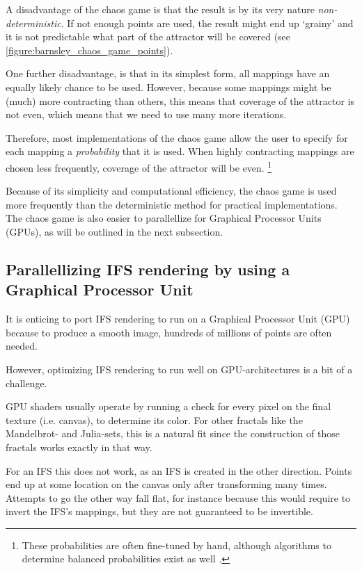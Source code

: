 \documentclass[11pt]{article}
\newcommand*{\altasterism}{\vspace*{1em plus .5em minus .5em}\noindent\hspace*{\fill}\ding{104}\hspace*{\fill}}
\begin{document}
A disadvantage of the chaos game is that the result is by its very nature \emph{non-deterministic}.
If not enough points are used, the result might end up `grainy' and it is not predictable what part of the attractor will be covered (see \autoref{figure:barnsley_chaos_game_points}).

One further disadvantage, is that in its simplest form, all mappings have an equally likely chance to be used.
However, because some mappings might be (much) more contracting than others, this means that coverage of the attractor is not even,
which means that we need to use many more iterations.

Therefore, most implementations of the chaos game allow the user to specify for each mapping a \emph{probability} that it is used. 
When highly contracting mappings are chosen less frequently, coverage of the attractor will be even. \footnote{These probabilities are often fine-tuned by hand, although algorithms to determine balanced probabilities exist as well \cite{hepting1991rendering}.}

\altasterism

Because of its simplicity and computational efficiency, the chaos game is used more frequently than the deterministic method for practical implementations.
The chaos game is also easier to parallellize for Graphical Processor Units (GPUs), as will be outlined in the next subsection.

\subsection{Parallellizing IFS rendering by using a Graphical Processor Unit}
\label{sec:org046b784}

It is enticing to port IFS rendering to run on a Graphical Processor Unit (GPU) because to produce a smooth image, hundreds of millions of points are often needed.

However, optimizing IFS rendering to run well on GPU-architectures is a bit of a challenge.

GPU shaders usually operate by running a check for every pixel on the final texture (i.e. canvas), to determine its color.
For other fractals like the Mandelbrot- and Julia-sets, this is a natural fit since the construction of those fractals works exactly in that way.

For an IFS this does not work, as an IFS is created in the other direction. Points end up at some location on the canvas only after transforming many times.
Attempts to go the other way fall flat, for instance because this would require to invert the IFS's mappings, but they are not guaranteed to be invertible.
\end{document}
